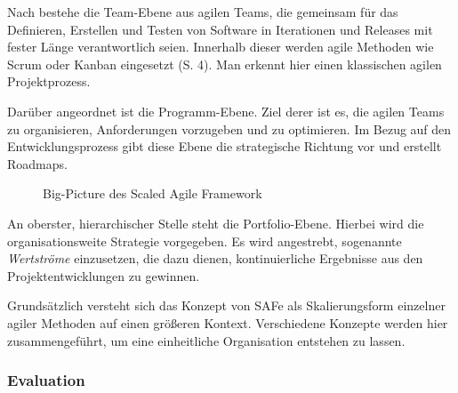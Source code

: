 Nach  bestehe die Team-Ebene aus agilen Teams, die gemeinsam für das Definieren, Erstellen und Testen von Software in Iterationen und Releases mit fester Länge verantwortlich seien. Innerhalb dieser werden agile Methoden wie Scrum oder Kanban eingesetzt (S. 4). Man erkennt hier einen klassischen agilen Projektprozess.

Darüber angeordnet ist die Programm-Ebene. Ziel derer ist es, die agilen Teams zu organisieren, Anforderungen vorzugeben und zu optimieren. Im Bezug auf den Entwicklungsprozess gibt diese Ebene die strategische Richtung vor und erstellt Roadmaps. \cite[S. 5]{turetken_assessing_2017}

\begin{figure}[H]
	\centering
	\caption[Big-Picture des Scaled Agile Framework]{Big-Picture des Scaled Agile Framework \protect \cite[S. 4]{turetken_assessing_2017}}
	\label{fig:safe}
\end{figure}

An oberster, hierarchischer Stelle  steht  die Portfolio-Ebene. Hierbei wird die organisationsweite Strategie vorgegeben. Es wird angestrebt, sogenannte \textit{Wertströme} einzusetzen, die dazu dienen, kontinuierliche  Ergebnisse aus den Projektentwicklungen zu gewinnen. \cite[S. 5]{turetken_assessing_2017}

Grundsätzlich versteht sich das Konzept von SAFe als Skalierungsform einzelner agiler Methoden auf einen größeren Kontext. Verschiedene Konzepte werden hier zusammengeführt, um eine einheitliche Organisation entstehen zu lassen.

\subsubsection{Evaluation}

